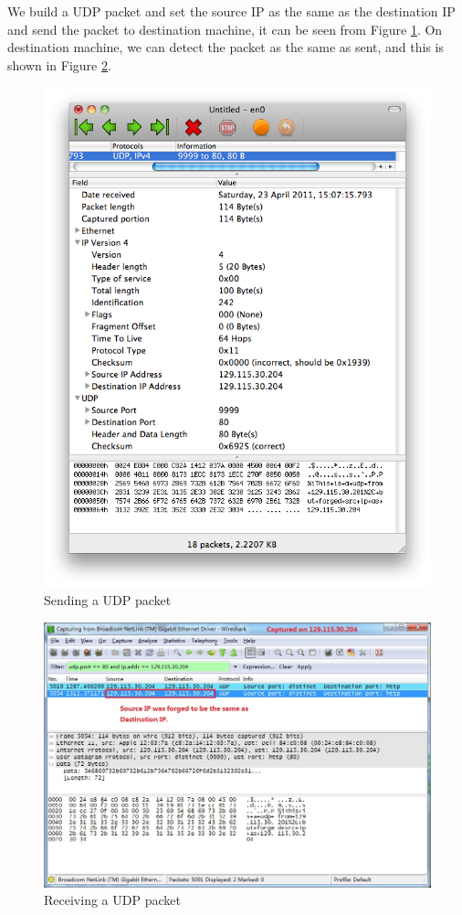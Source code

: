\documentclass[12pt,letterpaper]{report}
\begin{document}
We build a UDP packet and set the source IP as the same as 
the destination IP and send the packet to destination machine, 
it can be seen from Figure \ref{udp1}. On destination machine, we 
can detect the packet as the same as sent, and this is shown
in Figure \ref{udp2}.

\begin{figure}[!htp]
\centering
\includegraphics[width=0.8\linewidth]{udp1.png}
\caption{Sending a UDP packet}
\label{udp1}
\end{figure}


\begin{figure}[!htp]
\centering
\includegraphics[width=\linewidth]{udp2.jpg}
\caption{Receiving a UDP packet}
\label{udp2}
\end{figure}
\end{document}
